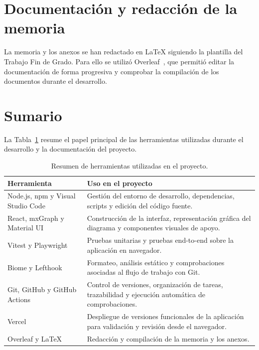 \section{Documentación y redacción de la memoria}

La memoria y los anexos se han redactado en LaTeX siguiendo la plantilla del Trabajo Fin de Grado. Para ello se utilizó Overleaf~\cite{overleaf}, que permitió editar la documentación de forma progresiva y comprobar la compilación de los documentos durante el desarrollo.

\section{Sumario}

La Tabla~\ref{tab:herramientas_proyecto} resume el papel principal de las herramientas utilizadas durante el desarrollo y la documentación del proyecto.

\begin{table}[htbp]
    \centering
    \small
    \caption{Resumen de herramientas utilizadas en el proyecto.}
    \label{tab:herramientas_proyecto}
    \begin{tabular}{p{} p{}}
        \toprule
        \textbf{Herramienta} & \textbf{Uso en el proyecto} \\
        \midrule
        Node.js, npm y Visual Studio Code & Gestión del entorno de desarrollo, dependencias, scripts y edición del código fuente. \\
        React, mxGraph y Material UI & Construcción de la interfaz, representación gráfica del diagrama y componentes visuales de apoyo. \\
        Vitest y Playwright & Pruebas unitarias y pruebas end-to-end sobre la aplicación en navegador. \\
        Biome y Lefthook & Formateo, análisis estático y comprobaciones asociadas al flujo de trabajo con Git. \\
        Git, GitHub y GitHub Actions & Control de versiones, organización de tareas, trazabilidad y ejecución automática de comprobaciones. \\
        Vercel & Despliegue de versiones funcionales de la aplicación para validación y revisión desde el navegador. \\
        Overleaf y LaTeX & Redacción y compilación de la memoria y los anexos. \\
        \bottomrule
    \end{tabular}
\end{table}